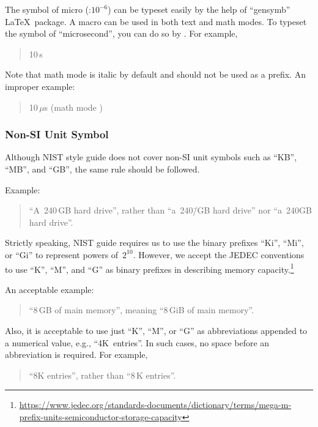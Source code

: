 The symbol of micro (\micro :$10^{-6}$) can be typeset easily by
the help of ``gensymb'' \LaTeX\ package.
A macro \qco{\\micro} can be used in both text and
math modes. To typeset the symbol of ``microsecond'', you can do
so by . For example,
\begin{quote}
  10\,\micro s
\end{quote}

Note that math mode \qco{\\mu} is italic by default and should not
be used as a prefix. An improper example:
\begin{quote}
  10\,$\mu $s (math mode \qco{\\mu})
\end{quote}

\subsubsection{Non-SI Unit Symbol}
\label{sec:app:styleguide:Non-SI Unit Symbol}

Although NIST style guide does not cover non-SI unit symbols
such as ``KB'', ``MB'', and ``GB'', the same rule should be followed.

Example:

\begin{quote}
  ``A~240\,GB hard drive'', rather than ``a~240\=/GB hard drive''
  nor ``a~240GB hard drive''.
\end{quote}

Strictly speaking, NIST guide requires us to use the binary prefixes
``Ki'', ``Mi'', or ``Gi'' to represent powers of~$2^{10}$.
However, we accept the JEDEC conventions to use ``K'', ``M'',
and ``G'' as binary prefixes in describing memory capacity.\footnote{
  \url{https://www.jedec.org/standards-documents/dictionary/terms/mega-m-prefix-units-semiconductor-storage-capacity}}

An acceptable example:
\begin{quote}
  ``8\,GB of main memory'', meaning ``8\,GiB of main memory''.
\end{quote}

Also, it is acceptable to use just ``K'', ``M'', or ``G'' as abbreviations
appended to a numerical value, e.g., ``4K~entries''. In such cases, no space
before an abbreviation is required. For example,

\begin{quote}
  ``8K entries'', rather than ``8\,K entries''.
\end{quote}

